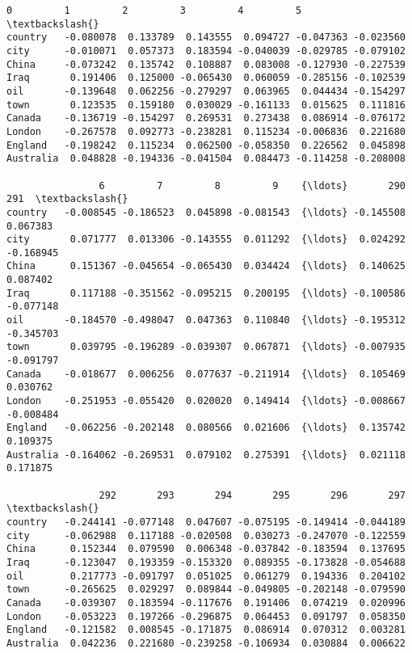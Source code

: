 \documentclass[11pt]{article}
\makeatletter
\newcommand{\boxspacing}{\kern\kvtcb@left@rule\kern\kvtcb@boxsep}
\newcommand{\prompt}[4]{
        \ttfamily\llap{{\color{#2}[#3]:\hspace{3pt}#4}}\vspace{-\baselineskip}
    }
\makeatother
\begin{document}
            \begin{tcolorbox}[breakable, size=fbox, boxrule=.5pt, pad at break*=1mm, opacityfill=0]
\prompt{Out}{outcolor}{10}{\boxspacing}
\begin{Verbatim}[commandchars=\\\{\}]
                0         1         2         3         4         5    \textbackslash{}
country   -0.080078  0.133789  0.143555  0.094727 -0.047363 -0.023560
city      -0.010071  0.057373  0.183594 -0.040039 -0.029785 -0.079102
China     -0.073242  0.135742  0.108887  0.083008 -0.127930 -0.227539
Iraq       0.191406  0.125000 -0.065430  0.060059 -0.285156 -0.102539
oil       -0.139648  0.062256 -0.279297  0.063965  0.044434 -0.154297
town       0.123535  0.159180  0.030029 -0.161133  0.015625  0.111816
Canada    -0.136719 -0.154297  0.269531  0.273438  0.086914 -0.076172
London    -0.267578  0.092773 -0.238281  0.115234 -0.006836  0.221680
England   -0.198242  0.115234  0.062500 -0.058350  0.226562  0.045898
Australia  0.048828 -0.194336 -0.041504  0.084473 -0.114258 -0.208008

                6         7         8         9    {\ldots}       290       291  \textbackslash{}
country   -0.008545 -0.186523  0.045898 -0.081543  {\ldots} -0.145508  0.067383
city       0.071777  0.013306 -0.143555  0.011292  {\ldots}  0.024292 -0.168945
China      0.151367 -0.045654 -0.065430  0.034424  {\ldots}  0.140625  0.087402
Iraq       0.117188 -0.351562 -0.095215  0.200195  {\ldots} -0.100586 -0.077148
oil       -0.184570 -0.498047  0.047363  0.110840  {\ldots} -0.195312 -0.345703
town       0.039795 -0.196289 -0.039307  0.067871  {\ldots} -0.007935 -0.091797
Canada    -0.018677  0.006256  0.077637 -0.211914  {\ldots}  0.105469  0.030762
London    -0.251953 -0.055420  0.020020  0.149414  {\ldots} -0.008667 -0.008484
England   -0.062256 -0.202148  0.080566  0.021606  {\ldots}  0.135742  0.109375
Australia -0.164062 -0.269531  0.079102  0.275391  {\ldots}  0.021118  0.171875

                292       293       294       295       296       297  \textbackslash{}
country   -0.244141 -0.077148  0.047607 -0.075195 -0.149414 -0.044189
city      -0.062988  0.117188 -0.020508  0.030273 -0.247070 -0.122559
China      0.152344  0.079590  0.006348 -0.037842 -0.183594  0.137695
Iraq      -0.123047  0.193359 -0.153320  0.089355 -0.173828 -0.054688
oil        0.217773 -0.091797  0.051025  0.061279  0.194336  0.204102
town      -0.265625  0.029297  0.089844 -0.049805 -0.202148 -0.079590
Canada    -0.039307  0.183594 -0.117676  0.191406  0.074219  0.020996
London    -0.053223  0.197266 -0.296875  0.064453  0.091797  0.058350
England   -0.121582  0.008545 -0.171875  0.086914  0.070312  0.003281
Australia  0.042236  0.221680 -0.239258 -0.106934  0.030884  0.006622


\end{Verbatim}
\end{tcolorbox}
\end{document}
